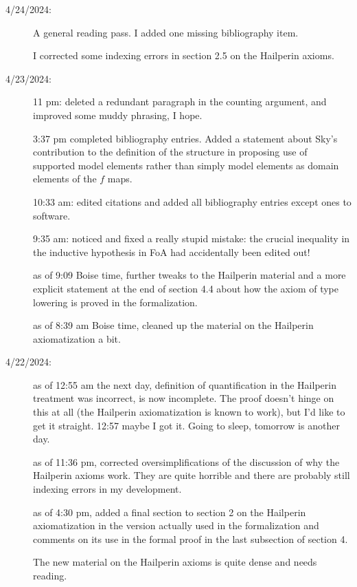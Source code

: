 \documentclass[112pt]{article}
\begin{document}
\begin{description}
\item[4/24/2024:]  A general reading pass.  I added one missing bibliography item.

I corrected some indexing errors in section 2.5 on the Hailperin axioms.

\item[4/23/2024:]  

11 pm:  deleted a redundant paragraph in the counting argument, and improved some muddy phrasing, I hope.

3:37 pm completed bibliography entries.  Added a statement about Sky's contribution to the definition of the structure in proposing use of supported model elements rather than simply model elements as domain elements of the $f$ maps.

10:33 am:  edited citations and added all bibliography entries except ones to software.

9:35 am:  noticed and fixed a really stupid mistake:  the crucial inequality in the inductive hypothesis in FoA had accidentally been edited out!

as of 9:09 Boise time, further tweaks to the Hailperin material and a more explicit statement at the end of section 4.4 about how the axiom of type lowering is proved in the formalization.



as of 8:39 am Boise time, cleaned up the material on the Hailperin axiomatization a bit.

\item[4/22/2024:]  

as of 12:55 am the next day, definition of quantification in the Hailperin treatment was incorrect, is now incomplete.  The proof doesn't hinge on this at all (the Hailperin axiomatization is known to work), but I'd like to get it straight.  12:57 maybe I got it.  Going to sleep, tomorrow is another day.

as of 11:36 pm, corrected oversimplifications of the discussion of why the Hailperin axioms work.  They are quite horrible and there are probably still indexing errors in my development.

as of 4:30 pm, added a final section to section 2 on the Hailperin axiomatization in the version actually used in the formalization and comments on its use in the formal proof in the last subsection of section 4.

The new material on the Hailperin axioms is quite dense and needs reading.




\end{description}
\end{document}
